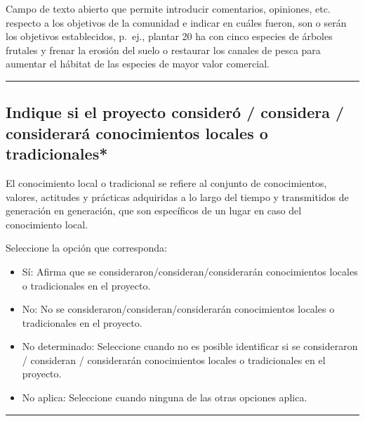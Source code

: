 \documentclass[
]{book}
\providecommand{\tightlist}{%
  \setlength{\itemsep}{0pt}\setlength{\parskip}{0pt}}
\begin{document}
Campo de texto abierto que permite introducir comentarios, opiniones, etc. respecto a los objetivos de la comunidad e indicar en cuáles fueron, son o serán los objetivos establecidos, p.~ej., plantar 20 ha con cinco especies de árboles frutales y frenar la erosión del suelo o restaurar los canales de pesca para aumentar el hábitat de las especies de mayor valor comercial.

\begin{center}\rule{0.5\linewidth}{0.5pt}\end{center}

\hypertarget{indique-si-el-proyecto-consideruxf3-considera-consideraruxe1-conocimientos-locales-o-tradicionales}{%
\subsection*{\texorpdfstring{{Indique si el proyecto consideró / considera / considerará conocimientos locales o tradicionales*}}{Indique si el proyecto consideró / considera / considerará conocimientos locales o tradicionales*}}\label{indique-si-el-proyecto-consideruxf3-considera-consideraruxe1-conocimientos-locales-o-tradicionales}}

El conocimiento local o tradicional se refiere al conjunto de conocimientos, valores, actitudes y prácticas adquiridas a lo largo del tiempo y transmitidos de generación en generación, que son específicos de un lugar en caso del conocimiento local.

Seleccione la opción que corresponda:

\begin{itemize}
\tightlist
\item
  Sí: Afirma que se consideraron/consideran/considerarán conocimientos locales o tradicionales en el proyecto.
\item
  No: No se consideraron/consideran/considerarán conocimientos locales o tradicionales en el proyecto.
\item
  No determinado: Seleccione cuando no es posible identificar si se consideraron / consideran / considerarán conocimientos locales o tradicionales en el proyecto.
\item
  No aplica: Seleccione cuando ninguna de las otras opciones aplica.
\end{itemize}

\begin{center}\rule{0.5\linewidth}{0.5pt}\end{center}
\end{document}
